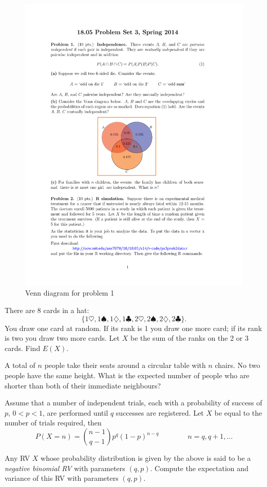 \documentclass[a4paper,10pt,landscape,twocolumn]{scrartcl}
\begin{document}
\begin{figure}\centering
	\includegraphics[width=.2\textwidth]{media/03-venn}	
	\caption{Venn diagram for problem 1\label{fig:venn}}
\end{figure}



\begin{exercise}
There are $8$ cards in a hat:
	\[
		\{1\heartsuit, 1\spadesuit, 1\diamondsuit, 1\clubsuit, 2\heartsuit, 2\spadesuit, 2\diamondsuit, 2\clubsuit\}.
	\]
You draw one card at random. If its rank is 1 you draw one more card; if its rank is two you draw two more cards. Let $X$ be the sum of the ranks on the 2 or 3 cards. Find $E(X)$.
	
\end{exercise}

\begin{exercise}
	A total of $n$ people take their seats around a circular table with $n$ chairs. No two people have the same height. What is the expected number of people who are shorter than both of their immediate neighbours?
\end{exercise}


%	


\begin{exercise}
 Assume that a number of independent trials, each with a probability of success of $p$, $0 < p < 1$, are performed until $q$ successes are registered. Let $X$ be equal to the number of trials required, then
	$$P(X = n) = {{n-1} \choose {q-1}} p^{q} (1 - p)^{n-q} \qquad \qquad n = q, q+1, ...$$

	Any RV $X$ whose probability distribution is given by the above is said to be a {\em negative binomial RV} with parameters $(q,p)$. Compute the expectation and variance of this RV with parameters $(q,p)$.	
\end{exercise}
\end{document}
